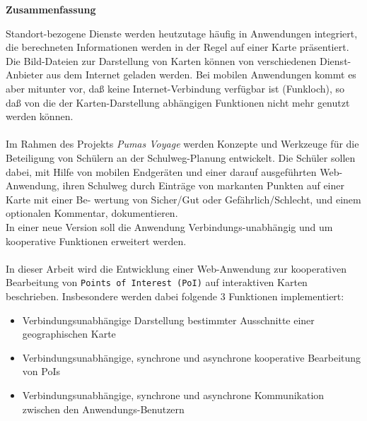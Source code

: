 \begin{center}
\textbf{Zusammenfassung}
\end{center}

\noindent
Standort-bezogene Dienste werden heutzutage häufig
in Anwendungen integriert, die berechneten Informationen werden in der Regel auf einer Karte präsentiert. Die Bild-Dateien zur Darstellung von Karten können von verschiedenen Dienst-Anbieter aus dem Internet geladen werden. Bei mobilen Anwendungen kommt es aber mitunter vor, daß keine Internet-Verbindung verfügbar ist (Funkloch), so daß von die der Karten-Darstellung abhängigen Funktionen nicht mehr genutzt werden können.\\ \\
\noindent
Im Rahmen des Projekts \textit{Pumas Voyage} werden Konzepte und Werkzeuge für die Beteiligung von Schülern an der Schulweg-Planung entwickelt. Die Schüler sollen dabei, mit Hilfe von mobilen Endgeräten und einer darauf ausgeführten Web-Anwendung, ihren Schulweg durch Einträge von markanten Punkten auf einer Karte mit einer Be-
wertung von Sicher/Gut oder Gefährlich/Schlecht, und einem optionalen Kommentar, dokumentieren.\\
In einer neue Version soll die Anwendung Verbindungs-unabhängig und um kooperative Funktionen erweitert werden.\\ \\
\noindent
In dieser Arbeit wird die Entwicklung einer Web-Anwendung zur kooperativen Bearbeitung von \texttt{Points of Interest (PoI)} auf interaktiven Karten beschrieben.
Insbesondere werden dabei folgende 3 Funktionen implementiert:
\begin{itemize}
\item Verbindungsunabhängige Darstellung bestimmter Ausschnitte einer geographischen Karte
\item Verbindungsunabhängige, synchrone und asynchrone kooperative Bearbeitung von PoIs
\item Verbindungsunabhängige, synchrone und asynchrone Kommunikation zwischen den Anwendungs-Benutzern
\end{itemize}


